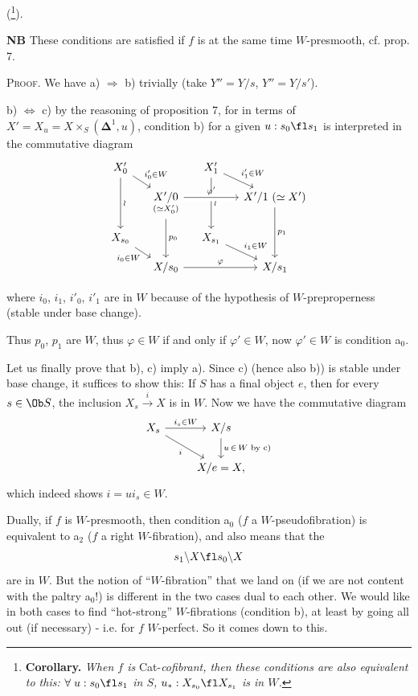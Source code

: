 (\footnote[49]{\textbf{Corollary.} \textit{When $f$ is} Cat-\textit{cofibrant, then these conditions are also equivalent to this: $\forall\; u : s_0\fl s_1$ in $S$, $u_* : X_{s_0}\fl X_{s_1}$ is in $W$.}}).

\textbf{NB} These conditions are satisfied if $f$ is at the same time $W$-presmooth, cf. prop. 7.

\textsc{Proof}. We have a) $\Longrightarrow$ b) trivially (take $Y''=Y/s$, $Y''=Y/s'$).

b) $\Longleftrightarrow$ c) by the reasoning of proposition 7, for in terms of $X'=X_u=X\times_S(\boldsymbol{\Delta}^1,u)$, condition b) for a given $u : s_0\fl s_1$ is interpreted in the commutative diagram
\[
\begin{tikzcd}[column sep=small, row sep=small]
X'_0 \arrow[dr, "i'_0\in W"] \arrow[dd, "\wr"] & & X'_1 \arrow[dr, "i'_1\in W"] \arrow[dd, "\wr"] & \\
 & \underset{(\simeq X'_0)}{X'/0} \arrow[rr, "\varphi'", crossing over] \arrow[dd, "p_0"] & & X'/1\ (\simeq X') \arrow[dd, "p_1"] \\
X_{s_0} \arrow[dr, "i_0\in W"'] & & X_{s_1} \arrow[dr, "i_1\in W"] & \\
 & X/s_0 \arrow[rr, "\varphi"] & & X/s_1
\end{tikzcd}
\]

 where $i_0$, $i_1$, $i'_0$, $i'_1$ are in $W$ because of the hypothesis of $W$-preproperness (stable under base change).

Thus $p_0$, $p_1$ are $W$, thus $\varphi\in W$ if and only if $\varphi'\in W$, now $\varphi'\in W$ is condition a$_0$.

Let us finally prove that b), c) imply a). Since c) (hence also b)) is stable under base change, it suffices to show this: If $S$ has a final object $e$, then for every $s\in\Ob S$, the inclusion $X_s\xrightarrow{\ i\ }X$ is in $W$. Now we have the commutative diagram
\[
\begin{tikzcd}
X_s \arrow[r, "i_s\in W"] \arrow[dr, "i"'] & X/s \arrow[d, "u\,\in\,W\text{ by c) }"] \\
 & X/e=X,
\end{tikzcd}
\]
which indeed shows $i=ui_s\in W$.

Dually, if $f$ is $W$-presmooth, then condition a$_0$ ($f$ a $W$-pseudofibration) is equivalent to a$_2$ ($f$ a right $W$-fibration), and also means that the
\[ s_1\backslash X\fl s_0\backslash X \]
are in $W$. But the notion of ``$W$-fibration'' that we land on (if we are not content with the paltry a$_0$!) is different in the two cases dual to each other. We would like in both cases to find ``hot-strong'' $W$-fibrations (condition b), at least by going all out (if necessary) - i.e. for $f$ $W$-perfect. So it comes down to this.

